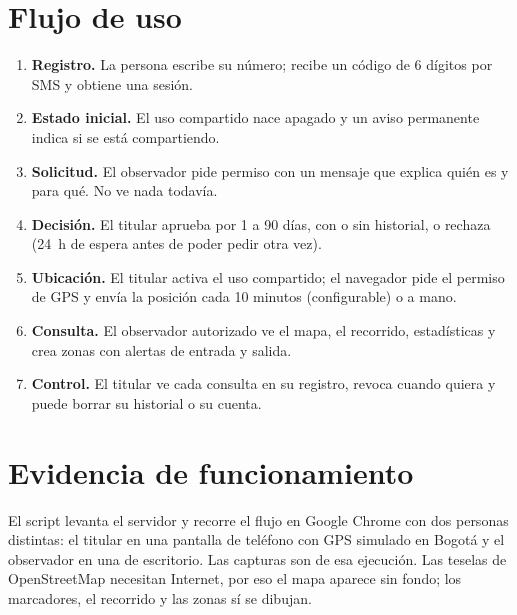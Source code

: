 \section{Flujo de uso}
\begin{enumerate}
\item \textbf{Registro.} La persona escribe su número; recibe un código de 6 dígitos por SMS y obtiene una sesión.
\item \textbf{Estado inicial.} El uso compartido nace apagado y un aviso permanente indica si se está compartiendo.
\item \textbf{Solicitud.} El observador pide permiso con un mensaje que explica quién es y para qué. No ve nada todavía.
\item \textbf{Decisión.} El titular aprueba por 1 a 90 días, con o sin historial, o rechaza (24~h de espera antes de poder pedir otra vez).
\item \textbf{Ubicación.} El titular activa el uso compartido; el navegador pide el permiso de GPS y envía la posición cada 10 minutos (configurable) o a mano.
\item \textbf{Consulta.} El observador autorizado ve el mapa, el recorrido, estadísticas y crea zonas con alertas de entrada y salida.
\item \textbf{Control.} El titular ve cada consulta en su registro, revoca cuando quiera y puede borrar su historial o su cuenta.
\end{enumerate}

\section{Evidencia de funcionamiento}
El script  levanta el servidor y recorre el flujo en Google Chrome con dos personas distintas: el titular en una pantalla de teléfono con GPS simulado en Bogotá y el observador en una de escritorio. Las capturas son de esa ejecución. Las teselas de OpenStreetMap necesitan Internet, por eso el mapa aparece sin fondo; los marcadores, el recorrido y las zonas sí se dibujan.

